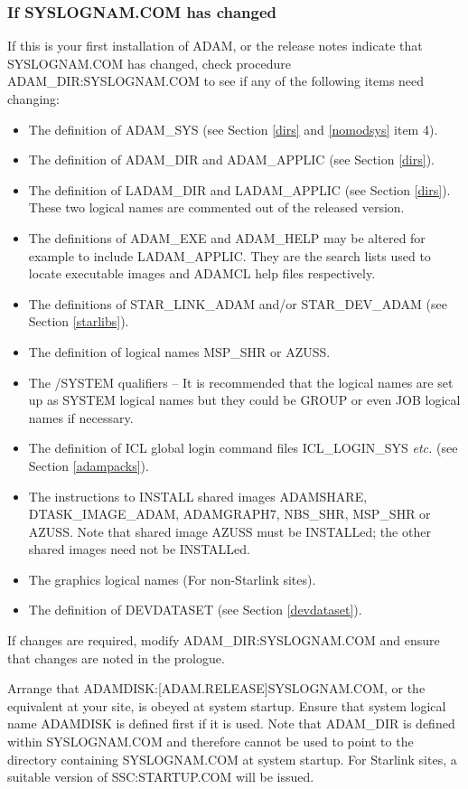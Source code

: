 \subsubsection{If SYSLOGNAM.COM has changed}
\label{modsys}
If this is your first installation of ADAM, or the release notes indicate that
SYS\-LOGNAM\-.COM has changed, check procedure ADAM\_DIR:\-SYS\-LOG\-NAM.\-COM
to see if any of the following items need changing:
\begin{itemize}
\item The definition of ADAM\_SYS (see Section \ref{dirs} and \ref{nomodsys}
item 4).
\item The definition of ADAM\_DIR and ADAM\_APPLIC (see Section \ref{dirs}).
\item The definition of LADAM\_DIR and LADAM\_APPLIC (see Section \ref{dirs}).
These two logical names are commented out of the released version.
\item The definitions of ADAM\_EXE and ADAM\_HELP may be altered for example
to include LADAM\-\_APP\-LIC. They are the search lists used to locate
executable images and ADAMCL help files respectively.
\item The definitions of STAR\_LINK\_ADAM and/or STAR\_DEV\_ADAM (see Section 
\ref{starlibs}).
\item The definition of logical names MSP\_SHR or AZUSS.
\item The /SYSTEM qualifiers --
It is recommended that the logical names are set up as SYSTEM logical names 
but they could be GROUP or even JOB logical names if necessary.
\item The definition of ICL global login command files ICL\-\_LOGIN\-\_SYS
{\em etc.} (see Section \ref{adampacks}).
\item The instructions to INSTALL shared images ADAMSHARE,
DTASK\-\_IMAGE\-\_ADAM, ADAMGRAPH7, NBS\-\_SHR, MSP\-\_SHR or AZUSS.
Note that shared image AZUSS must be INSTALLed; the other shared
images need not be INSTALLed.
\item The graphics logical names (For non-Starlink sites).
\item The definition of DEVDATASET (see Section \ref{devdataset}).
\end{itemize}

If changes are required, modify ADAM\_DIR:SYSLOGNAM.COM and ensure that 
changes are noted in the prologue.

Arrange that ADAMDISK:[ADAM.RELEASE]SYSLOGNAM.COM, or the equivalent at your
site, is obeyed at system startup.
Ensure that system logical name ADAMDISK is defined first if it is used.
Note that ADAM\_DIR is defined within SYSLOGNAM.COM and therefore cannot be used
to point to the directory containing SYSLOGNAM.COM at system startup.
For Starlink sites, a suitable version of SSC:STARTUP.COM will be issued.

